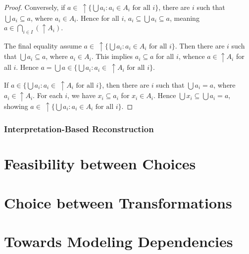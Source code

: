 \documentclass[12pt]{article}
\theoremstyle{definition}
\theoremstyle{plain}
\theoremstyle{plain}
\theoremstyle{plain}
\theoremstyle{plain}
\theoremstyle{remark}
\theoremstyle{remark}
\newcommand{\sub}{\subseteq}
\begin{document}
\begin{tcolorbox}[title = Calculation Rules]
\begin{proof}
		Conversely, if $a \in \: \uparrow \!\!\! \{\bigcup a_i: a_i \in A_i \text{ for all } i \}$, there are $i$ such that $\bigcup a_i \sub a$, where $a_i \in A_i$. Hence for all $i$, $a_i \sub \bigcup a_i \sub a$, meaning $a \in \bigcap_{i \in I}(\uparrow A_i)$.
		
		The final equality assume $a \in \: \uparrow \!\!\! \{\bigcup a_i: a_i \in A_i \text{ for all } i \}$. Then there are $i$ such that $\bigcup a_i \sub a$, where $a_i \in A_i$. This implies $a_i \sub a$ for all $i$, whence $a \in \uparrow A_i$ for all $i$. Hence $a = \bigcup a  \in \{\bigcup a_i: a_i \in \: \uparrow \!\! A_i \text{ for all } i \}$.
		
		If $a \in \{\bigcup a_i: a_i \in \: \uparrow \!\! A_i \text{ for all } i \}$, then there are $i$ such that $\bigcup a_i = a$, where $a_i \in \uparrow A_i$. For each $i$, we have $x_i \sub a_i$ for $x_i \in A_i$. Hence $\bigcup x_i \sub \bigcup a_i = a$, showing $a \in \: \uparrow \!\!\! \{\bigcup a_i: a_i \in A_i \text{ for all } i \}$.
	\end{proof}
\end{tcolorbox}

\subsubsection{Interpretation-Based Reconstruction}



\section{Feasibility between Choices}

\section{Choice between Transformations}

\section{Towards Modeling Dependencies}

\printbibliography
\end{document}
